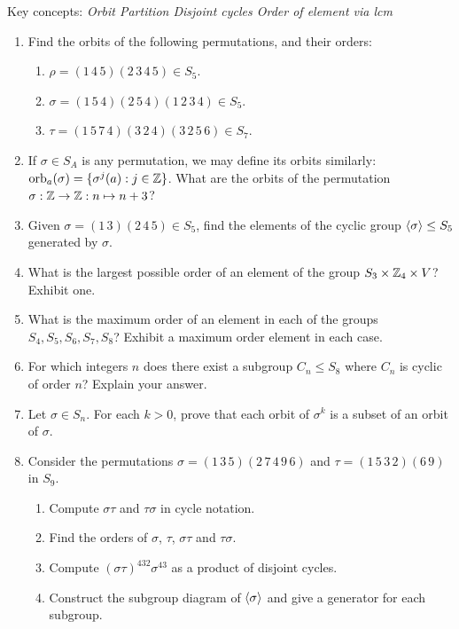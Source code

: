 \goodbreak

\begin{exercises}
	Key concepts:\quad
		\emph{Orbit \quad Partition \quad Disjoint cycles \quad Order of element via lcm}
	
	\begin{enumerate}
	  \item Find the orbits of the following permutations, and their orders:
	  \begin{enumerate}
	    \item $\rho=(1\,4\,5)(2\,3\,4\,5)\in S_5$.
	    \item $\sigma=(1\,5\,4)(2\,5\,4)(1\,2\,3\,4)\in S_5$.
	    \item $\tau=(1\,5\,7\,4)(3\,2\,4)(3\,2\,5\,6)\in S_7$.
	  \end{enumerate}
	
	
	  \item If $\sigma\in S_A$ is any permutation, we may define its orbits similarly: $\mathrm{orb}_a(\sigma)=\{\sigma^j(a):j\in\mathbb{Z}\}$. What are the orbits of the permutation $\sigma:\mathbb{Z}\to\mathbb{Z}:n\mapsto n+3$?
	  
		
		\item Given $\sigma=(1\,3)(2\,4\,5)\in S_5$, find the elements of the cyclic group $\left\langle \sigma\right\rangle\le S_5$ generated by $\sigma$.
		
		
		\item What is the largest possible order of an element of the group $S_3\times\mathbb{Z}_4\times V$? Exhibit one.
	
	
		\item What is the maximum order of an element in each of the groups $S_4,S_5,S_6,S_7,S_8$? Exhibit a maximum order element in each case.
		
	
		\item For which integers $n$ does there exist a subgroup $C_n\le S_8$ where $C_n$ is cyclic of order $n$? Explain your answer.
		
	
	 	\item Let $\sigma\in S_n$. For each $k>0$, prove that each orbit of $\sigma^k$ is a subset of an orbit of $\sigma$.
	 	
	
		\item Consider the permutations $\sigma=(1\,3\,5)(2\,7\,4\,9\,6)$ and $\tau=(1\,5\,3\,2)(6\,9)$ in $S_9$.
	  \begin{enumerate}
	      \item Compute $\sigma\tau$ and $\tau\sigma$ in cycle notation.
	      \item Find the orders of $\sigma$, $\tau$, $\sigma\tau$ and $\tau\sigma$.
	      \item Compute $(\sigma\tau)^{432}\sigma^{43}$ as a product of disjoint cycles.
				\item Construct the subgroup diagram of $\left\langle \sigma\right\rangle$ and give a generator for each subgroup.
	  \end{enumerate}
	  
	\end{enumerate}
\end{exercises}


